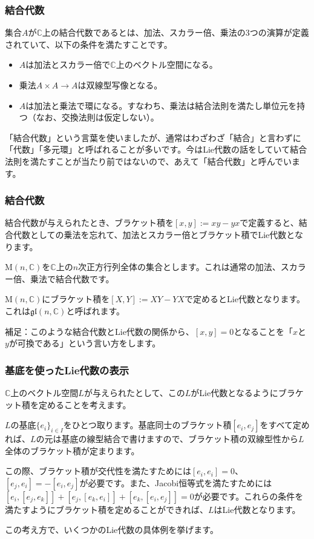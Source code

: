 \documentclass{beamer}
\begin{document}
\begin{frame}
    \frametitle{結合代数}

    \begin{definition}[結合代数]
        集合$A$が$ℂ$上の結合代数であるとは、加法、スカラー倍、乗法の3つの演算が定義されていて、以下の条件を満たすことです。
        \begin{itemize}
            \item $A$は加法とスカラー倍で$ℂ$上のベクトル空間になる。
            \item 乗法$A×A→A$は双線型写像となる。
            \item $A$は加法と乗法で環になる。すなわち、乗法は結合法則を満たし単位元を持つ（なお、交換法則は仮定しない）。
        \end{itemize}
    \end{definition}

    「結合代数」という言葉を使いましたが、通常はわざわざ「結合」と言わずに「代数」「多元環」と呼ばれることが多いです。今はLie代数の話をしていて結合法則を満たすことが当たり前ではないので、あえて「結合代数」と呼んでいます。
\end{frame}

\begin{frame}
    \frametitle{結合代数}

    結合代数が与えられたとき、ブラケット積を$[x,y]:=xy-yx$で定義すると、結合代数としての乗法を忘れて、加法とスカラー倍とブラケット積でLie代数となります。

    \begin{example}[行列のLie代数]
        $\mathrm{M}(n,ℂ)$を$ℂ$上の$n$次正方行列全体の集合とします。これは通常の加法、スカラー倍、乗法で結合代数です。

        $\mathrm{M}(n,ℂ)$にブラケット積を$[X,Y]:=XY-YX$で定めるとLie代数となります。これは$\mathfrak{gl}(n,ℂ)$と呼ばれます。
    \end{example}

    補足：このような結合代数とLie代数の関係から、$[x,y]=0$となることを「$x$と$y$が可換である」という言い方をします。
\end{frame}

\begin{frame}
    \frametitle{基底を使ったLie代数の表示}

    $ℂ$上のベクトル空間$L$が与えられたとして、この$L$がLie代数となるようにブラケット積を定めることを考えます。

    \bigskip

    $L$の基底$\{e_i\}_{i∈I}$をひとつ取ります。基底同士のブラケット積$[e_i,e_j]$をすべて定めれば、$L$の元は基底の線型結合で書けますので、ブラケット積の双線型性から$L$全体のブラケット積が定まります。

    \bigskip

    この際、ブラケット積が交代性を満たすためには$[e_i,e_i]=0$、$[e_j,e_i]=-[e_i,e_j]$が必要です。また、Jacobi恒等式を満たすためには$[e_i,[e_j,e_k]]+[e_j,[e_k,e_i]]+[e_k,[e_i,e_j]]=0$が必要です。これらの条件を満たすようにブラケット積を定めることができれば、$L$はLie代数となります。

    \bigskip

    この考え方で、いくつかのLie代数の具体例を挙げます。
\end{frame}
\end{document}
